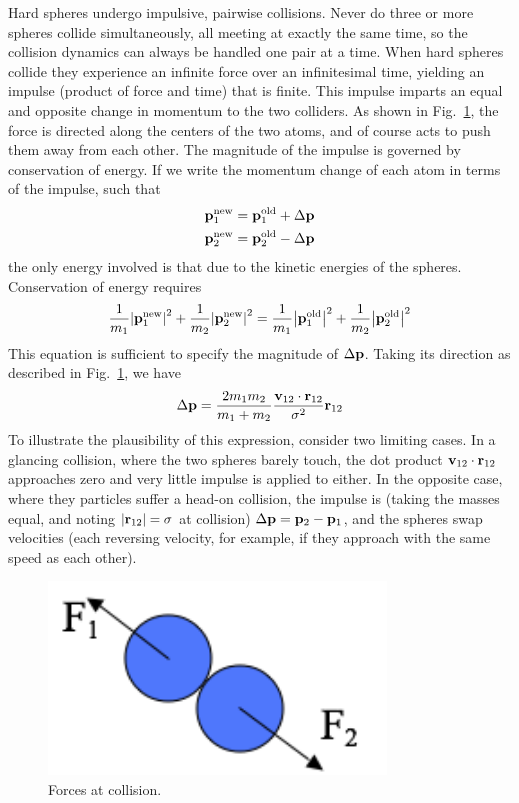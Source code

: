 \documentclass[9pt,bestpractices]{molsim}
\begin{document}
Hard spheres undergo impulsive, pairwise collisions. Never do three or
more spheres collide simultaneously, all meeting at exactly the same
time, so the collision dynamics can always be handled one pair at a
time. When hard spheres collide they experience an infinite force over
an infinitesimal time, yielding an impulse (product of force and time)
that is finite. This impulse imparts an equal and opposite change in
momentum to the two colliders. As shown in Fig.~\ref{fig:force}, the force is
directed along the centers of the two atoms, and of course acts to push
them away from each other. The magnitude of the impulse is governed by
conservation of energy. If we write the momentum change of each atom in
terms of the impulse, such that
\begin{align*}
  &{\bf{p}}_1^{\rm new} = {\bf{p}}_1^{\rm old} + \Delta {\bf{p}}\\
  &{\bf{p}}_2^{\rm new} = {\bf{p}}_2^{\rm old} - \Delta {\bf{p}}
\end{align*}
the only energy involved is that due to the kinetic energies of the
spheres. Conservation of energy requires
\[\frac{1}{{{m_1}}}{\left| {{\bf{p}}_1^{\rm new}} \right|^2} + \frac{1}{{{m_2}}}{\left| {{\bf{p}}_2^{\rm new}} \right|^2} = \frac{1}{{{m_1}}}{\left| {{\bf{p}}_1^{\rm old}} \right|^2} + \frac{1}{{{m_2}}}{\left| {{\bf{p}}_2^{\rm old}} \right|^2}\]
This equation is sufficient to specify the magnitude of $\Delta {\bf{p}}$. Taking its
direction as described in Fig.~\ref{fig:force}, we have
\[\Delta {\bf{p}} = \frac{{2{m_1}{m_2}}}{{{m_1} + {m_2}}}\frac{{{{\bf{v}}_{12}} \cdot {{\bf{r}}_{12}}}}{{{\sigma ^2}}}{{\bf{r}}_{12}}\]
To illustrate the plausibility of this expression, consider two limiting
cases. In a glancing collision, where the two spheres barely touch, the
dot product ${\bf v}_{12}\cdot{\bf r}_{12}$ approaches zero and very little impulse is applied to
either. In the opposite case, where they particles suffer a head-on
collision, the impulse is (taking the masses equal, and noting $|{\bf r}_{12}|=\sigma$ at
collision) $\Delta {\bf{p}} = {{\bf{p}}_2} - {{\bf{p}}_1}$, and the spheres swap velocities (each reversing velocity,
for example, if they approach with the same speed as each other).

\begin{figure}
  \centering
  \includegraphics[width=0.8\textwidth]{HSMD_figures/image001}
  \caption{\label{fig:force}Forces at collision.}
\end{figure}
  
\end{document}
